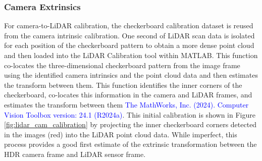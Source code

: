             
\subsubsection{Camera Extrinsics}

For camera-to-LiDAR calibration, the checkerboard calibration dataset is reused from the camera intrinsic calibration.
One second of LiDAR scan data is isolated for each position of the checkerboard pattern to obtain a more dense point cloud and then loaded into the LiDAR Calibration tool within MATLAB.
This function co-locates the three-dimensional checkerboard pattern from the image frame using the identified camera intrinsics and the point cloud data and then estimates the transform between them. 
This function identifies the inner corners of the checkerboard, co-locates this information in the camera and LiDAR frames, and estimates the transform between them \textcolor{blue}{The MathWorks, Inc. (2024). Computer Vision Toolbox version: 24.1 (R2024a)}. 
This initial calibration is shown in Figure \ref{fig:lidar_cam_calibration} by projecting the inner checkerboard corners detected in the images (red) into the LiDAR point cloud data.
While imperfect, this process provides a good first estimate of the extrinsic transformation between the HDR camera frame and LiDAR sensor frame.


